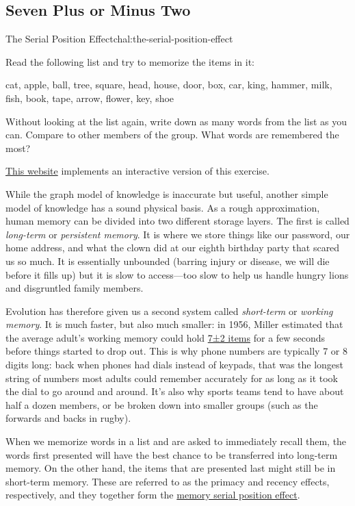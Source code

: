 \subsection{Seven Plus or Minus Two}\label{seven-plus-or-minus-two}

\begin{challenge}{The Serial Position Effect}{chal:the-serial-position-effect}

Read the following list and try to memorize the items in it:

cat, apple, ball, tree, square, head, house, door, box, car, king,
hammer, milk, fish, book, tape, arrow, flower, key, shoe

Without looking at the list again, write down as many words from the
list as you can. Compare to other members of the group. What words are
remembered the most?

\href{http://cat.xula.edu/thinker/memory/working/serial}{This website}
implements an interactive version of this exercise.
\end{challenge}

While the graph model of knowledge is inaccurate but useful, another
simple model of knowledge has a sound physical basis. As a rough
approximation, human memory can be divided into two different storage
layers. The first is called \emph{long-term} or \emph{persistent
memory}. It is where we store things like our password, our home
address, and what the clown did at our eighth birthday party that scared
us so much. It is essentially unbounded (barring injury or disease, we
will die before it fills up) but it is slow to access---too slow to help
us handle hungry lions and disgruntled family members.

Evolution has therefore given us a second system called
\emph{short-term} or \emph{working memory}. It is much faster, but also
much smaller: in 1956, Miller estimated that the average adult's working
memory could hold
\href{https://en.wikipedia.org/wiki/The\_Magical\_Number\_Seven,\_Plus\_or\_Minus\_Two}{7±2
items} for a few seconds before things started to drop out. This is why
phone numbers are typically 7 or 8 digits long: back when phones had
dials instead of keypads, that was the longest string of numbers most
adults could remember accurately for as long as it took the dial to go
around and around. It's also why sports teams tend to have about half a
dozen members, or be broken down into smaller groups (such as the
forwards and backs in rugby).

When we memorize words in a list and are asked to immediately recall
them, the words first presented will have the best chance to be
transferred into long-term memory. On the other hand, the items that are
presented last might still be in short-term memory. These are referred
to as the primacy and recency effects, respectively, and they together
form the
\href{https://en.wikipedia.org/wiki/Serial\_position\_effect}{memory
serial position effect}.

